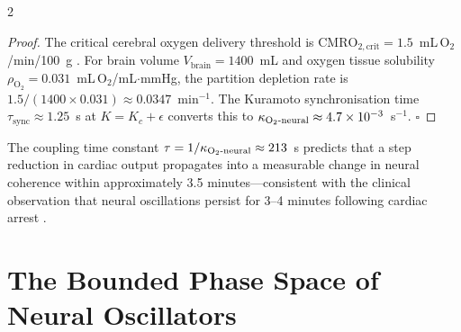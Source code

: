 \begin{multicols}{2}
\begin{proof}
The critical cerebral oxygen delivery threshold is
$\mathrm{CMRO}_{2,\mathrm{crit}} = 1.5$~mL\,O$_2$/min/100~g
\citep{west2012respiratory}. For brain volume $V_{\mathrm{brain}}
= 1400$~mL and oxygen tissue solubility $\rho_{\mathrm{O}_2} =
0.031$~mL\,O$_2$/mL$\cdot$mmHg, the partition depletion rate is
$1.5/(1400 \times 0.031) \approx 0.0347$~min$^{-1}$. The Kuramoto
synchronisation time $\tau_{\mathrm{sync}} \approx 1.25$~s at
$K = K_c + \epsilon$ converts this to
$\kappa_{\mathrm{O_2\text{-}neural}} \approx 4.7\times10^{-3}$~s$^{-1}$. $\square$
\end{proof}

The coupling time constant $\tau = 1/\kappa_{\mathrm{O_2\text{-}neural}} \approx 213$~s predicts
that a step reduction in cardiac output propagates into a measurable
change in neural coherence within approximately 3.5 minutes---consistent
with the clinical observation that neural oscillations persist
for 3--4 minutes following cardiac arrest \citep{parnia2014aware}.

\end{multicols}

\section{The Bounded Phase Space of Neural Oscillators}
\label{sec:ch09-BPS}

